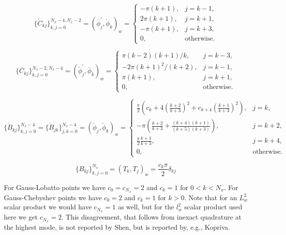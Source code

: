 \documentclass[11pt, oneside]{article}
\newcommand{\N}[1]{\check{#1}}
\newcommand{\D}[1]{\overline{#1}}
\begin{document}
\begin{equation}
 \{\N{C}_{kj}\}_{k,j=0}^{N_x-4, N_x-2} = \left(\D{\phi}^{'}_j, \N{\phi}_k 
 \right)_w = \begin{cases}
 -\pi(k+1), &j=k-1,\\
 2\pi(k+1), & j=k+1, \\
 -\pi(k+1), & j=k+3, \\
 0, &\text{otherwise}.
 \end{cases}
\end{equation}

\begin{equation}
 \{\D{C}_{kj}\}_{k,j=0}^{N_x-2, N_x-4} = \left(\N{\phi}^{'}_j, \D{\phi}_k 
 \right)_w = \begin{cases}
 \pi (k-2)(k+1)/k, &j=k-3,\\
 -2 \pi(k+1)^2/(k+2), & j=k-1, \\
 \pi(k+1), & j=k+1, \\
 0, &\text{otherwise}.
 \end{cases}
\end{equation}

\begin{equation}
 \{\N{B}_{kj}\}_{k,j=0}^{N_x-4} = \{\N{B}_{jk}\}_{j,k=0}^{N_x-4} = (\N{\phi}_j, 
 \N{\phi}_k)_w = \begin{cases}
 \frac{\pi}{2} \left(c_k + 4 \left(\frac{k+2}{k+3} \right)^2 + c_{k+4} 
 \left(\frac{k+1}{k+3}\right)^2    \right), &j=k,\\
 -\pi \left( \frac{k+2}{k+3} + \frac{(k+4)(k+1)}{(k+5)(k+3)} \right), &j=k+2,\\
 \frac{\pi}{2} \frac{k+1}{k+3} , & j=k+4, \\
 0, &\text{otherwise}.
 \end{cases}
\end{equation}

\begin{equation}
 \{B_{kj}\}_{k,j=0}^{N_x} = (T_k, T_j)_w = \frac{c_k \pi}{2} \delta_{kj}
\end{equation}

For Gauss-Lobatto points we have $c_0=c_{N_x}=2$ and $c_k=1$ for $0<k<N_x$. For Gauss-Chebyshev points we have $c_0=2$ and $c_k=1$ for $k>0$. Note that for an $L^2_w$ scalar product we would have $c_{N_x}=1$ as well, but for the $l^2_w$ scalar product used here we get $c_{N_x}=2$. This disagreement, that follows from inexact quadrature at the highest mode, is not reported by Shen, but is reported by, e.g., Kopriva.
\end{document}
